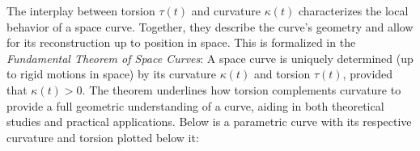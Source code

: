 \noindent The interplay between torsion \( \tau(t) \) and curvature \( \kappa(t) \) characterizes the local behavior of a space curve. Together, they describe the curve’s geometry and allow for its reconstruction up to position in space. This is formalized in the \textit{Fundamental Theorem of Space Curves}: A space curve is uniquely determined (up to rigid motions in space) by its curvature \( \kappa(t) \) and torsion \( \tau(t) \), provided that \( \kappa(t) > 0 \). The theorem underlines how torsion complements curvature to provide a full geometric understanding of a curve, aiding in both theoretical studies and practical applications. Below is a parametric curve with its respective curvature and torsion plotted below it:


